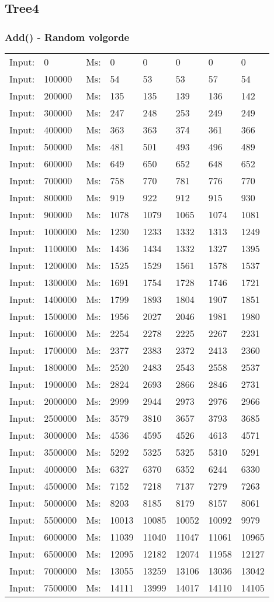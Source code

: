 \documentclass[11pt,a4paper]{report}
\begin{document}
\begin{tiny}
\subsection*{Tree4}
\subsubsection*{Add() - Random volgorde}
\begin{tabular}{l l ||l  l  l  l  l  l}
Input:&0&Ms:&0&0&0&0&0\\
Input:&100000&Ms:&54&53&53&57&54\\
Input:&200000&Ms:&135&135&139&136&142\\
Input:&300000&Ms:&247&248&253&249&249\\
Input:&400000&Ms:&363&363&374&361&366\\
Input:&500000&Ms:&481&501&493&496&489\\
Input:&600000&Ms:&649&650&652&648&652\\
Input:&700000&Ms:&758&770&781&776&770\\
Input:&800000&Ms:&919&922&912&915&930\\
Input:&900000&Ms:&1078&1079&1065&1074&1081\\
Input:&1000000&Ms:&1230&1233&1332&1313&1249\\
Input:&1100000&Ms:&1436&1434&1332&1327&1395\\
Input:&1200000&Ms:&1525&1529&1561&1578&1537\\
Input:&1300000&Ms:&1691&1754&1728&1746&1721\\
Input:&1400000&Ms:&1799&1893&1804&1907&1851\\
Input:&1500000&Ms:&1956&2027&2046&1981&1980\\
Input:&1600000&Ms:&2254&2278&2225&2267&2231\\
Input:&1700000&Ms:&2377&2383&2372&2413&2360\\
Input:&1800000&Ms:&2520&2483&2543&2558&2537\\
Input:&1900000&Ms:&2824&2693&2866&2846&2731\\
Input:&2000000&Ms:&2999&2944&2973&2976&2966\\
Input:&2500000&Ms:&3579&3810&3657&3793&3685\\
Input:&3000000&Ms:&4536&4595&4526&4613&4571\\
Input:&3500000&Ms:&5292&5325&5325&5310&5291\\
Input:&4000000&Ms:&6327&6370&6352&6244&6330\\
Input:&4500000&Ms:&7152&7218&7137&7279&7263\\
Input:&5000000&Ms:&8203&8185&8179&8157&8061\\
Input:&5500000&Ms:&10013&10085&10052&10092&9979\\
Input:&6000000&Ms:&11039&11040&11047&11061&10965\\
Input:&6500000&Ms:&12095&12182&12074&11958&12127\\
Input:&7000000&Ms:&13055&13259&13106&13036&13042\\
Input:&7500000&Ms:&14111&13999&14017&14110&14105\\
\end{tabular}


\end{tiny}
\end{document}
